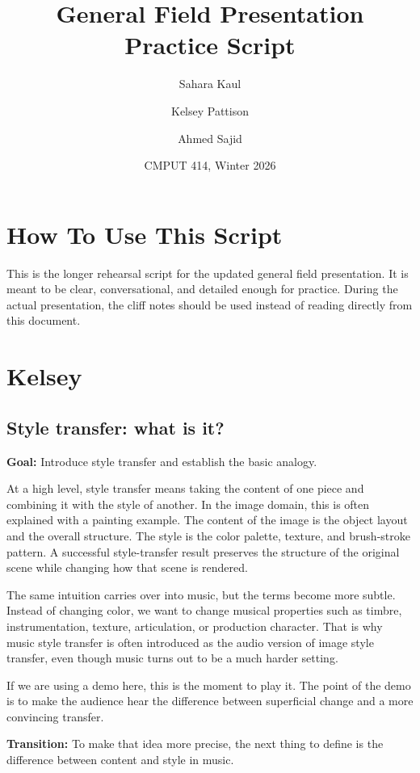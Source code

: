 \documentclass[11pt]{article}
\title{General Field Presentation\\Practice Script}
\author{Sahara Kaul \and Kelsey Pattison \and Ahmed Sajid}
\date{CMPUT 414, Winter 2026}
\begin{document}
\color{Ink}
\maketitle
\tableofcontents
\newpage

\section*{How To Use This Script}
This is the longer rehearsal script for the updated general field presentation. It is meant to be clear, conversational, and detailed enough for practice. During the actual presentation, the cliff notes should be used instead of reading directly from this document.

\newpage
\section{Kelsey}

\subsection*{Style transfer: what is it?}
\textbf{Goal:} Introduce style transfer and establish the basic analogy.

At a high level, style transfer means taking the content of one piece and combining it with the style of another. In the image domain, this is often explained with a painting example. The content of the image is the object layout and the overall structure. The style is the color palette, texture, and brush-stroke pattern. A successful style-transfer result preserves the structure of the original scene while changing how that scene is rendered.

The same intuition carries over into music, but the terms become more subtle. Instead of changing color, we want to change musical properties such as timbre, instrumentation, texture, articulation, or production character. That is why music style transfer is often introduced as the audio version of image style transfer, even though music turns out to be a much harder setting.

If we are using a demo here, this is the moment to play it. The point of the demo is to make the audience hear the difference between superficial change and a more convincing transfer.

\textbf{Transition:} To make that idea more precise, the next thing to define is the difference between content and style in music.
\end{document}
